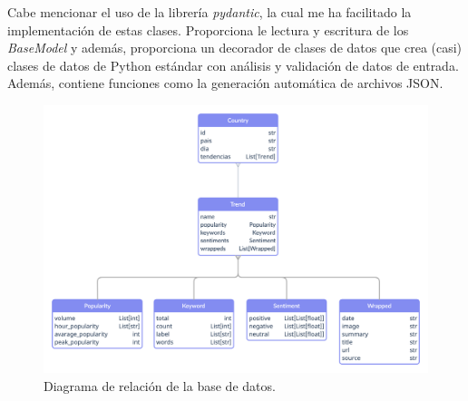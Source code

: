\vspace{0.3cm}

Cabe mencionar el uso de la librería \textit{pydantic}, la cual me ha facilitado la implementación de estas clases. Proporciona le lectura y escritura de los \textit{BaseModel} y además, proporciona un decorador de clases de datos que crea (casi) clases de datos de Python estándar con análisis y validación de datos de entrada. Además, contiene funciones como la generación automática de archivos \ac{JSON}. \cite{pydantic-manual}

\vspace{0.3cm}

\begin{figure}[H]
    \centering
    \myfloatalign
    \includegraphics[width=1\textwidth]{gfx/Models-diagram.png}
    \caption[Diagrama de relación de la base de datos]{Diagrama de relación de la base de datos.}\label{gfx:Models-diagram}
\end{figure}

\newpage


